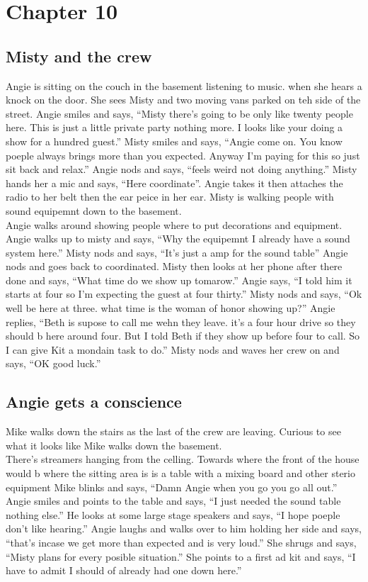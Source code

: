 \documentclass {article}[12pt]
\begin{document}
\section* {Chapter 10}
\subsection* {Misty and the crew}
Angie is sitting on the couch in the basement listening to music. when she hears a knock on the door. She sees Misty and two moving vans parked on teh side of the street. Angie smiles and says, ``Misty there's going to be only like twenty people here. This is just a little private party nothing more. I looks like your doing a show for a hundred guest.'' Misty smiles and says, ``Angie come on. You know poeple always brings more than you expected. Anyway I'm paying for this so just sit back and relax.'' Angie nods and says, ``feels weird not doing anything.'' Misty hands her a mic and says, ``Here coordinate''.  Angie takes it then attaches the radio to her belt then the ear peice in her ear. Misty is walking people with sound equipemnt down to the basement.\\

	Angie walks around showing people where to put decorations and equipment. Angie walks up to misty and says, ``Why the equipemnt I already have a sound system here.'' Misty nods and says, ``It's just a amp for the sound table'' Angie nods and goes back to coordinated. Misty then looks at her phone after there done and says, ``What time do we show up tomarow.'' Angie says, ``I told him it starts at four so I'm expecting the guest at four thirty.'' Misty nods and says, ``Ok well be here at three. what time is the woman of honor showing up?'' Angie replies, ``Beth is supose to call me wehn they leave. it's a four hour drive so they should b here around four. But I told Beth if they show up before four to call. So I can give Kit a mondain task to do.'' Misty nods and waves her crew on and says, ``OK good luck.''\\
	
\subsection* {Angie gets a conscience}
	Mike walks down the stairs as the last of the crew are leaving. Curious to see what it looks like Mike walks down the basement.\\
	There's streamers hanging from the celling. Towards where the front of the house would b where the sitting area is is a table with a mixing board and other sterio equipment Mike blinks and says, ``Damn Angie when you go you go all out.'' Angie smiles and points to the table and says, ``I just needed the sound table nothing else.'' He looks at some large stage speakers and says, ``I hope poeple don't like hearing.'' Angie laughs and walks over to him holding her side and says, ``that's incase we get more than expected and is very loud.'' She shrugs and says, ``Misty plans for every posible situation.'' She points to a first ad kit and says, ``I have to admit I should of already had one down here.''\\
\end{document}
